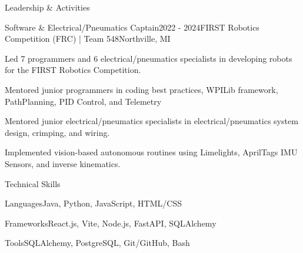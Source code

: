 \documentclass[
	11pt
]{resume}
\begin{document}
	\begin{rSection}{Leadership \& Activities}



		\begin{rSectionEntry}{Software \& Electrical/Pneumatics Captain}{2022 - 2024}{FIRST Robotics Competition (FRC) | Team 548}{Northville, MI}
			\item Led 7 programmers and 6 electrical/pneumatics specialists in developing robots for the FIRST Robotics Competition.
			\item Mentored junior programmers in coding best practices, WPILib framework, PathPlanning, PID Control, and Telemetry
			\item Mentored junior electrical/pneumatics specialists in electrical/pneumatics system design, crimping, and wiring.
			\item Implemented vision-based autonomous routines using Limelights, AprilTags IMU Sensors, and inverse kinematics.
		\end{rSectionEntry}
	\end{rSection}

	\begin{rSection}{Technical Skills}
		\begin{rSet}{Languages}{Java, Python, JavaScript, HTML/CSS}
		\end{rSet}
		\begin{rSet}{Frameworks}{React.js, Vite, Node.js, FastAPI, SQLAlchemy}
		\end{rSet}
		\begin{rSet}{Tools}{SQLAlchemy, PostgreSQL, Git/GitHub, Bash}
		\end{rSet}
	\end{rSection}
\end{document}
